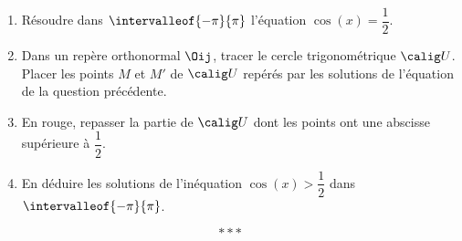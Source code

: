 \documentclass[10pt,openright,twoside,french]{book}
\begin{document}
\exo
\begin{enumerate}
    \item Résoudre dans $\intervalleof{-\pi}{\pi}$ l'équation $\cos(x) =\dfrac 12$.
    \item Dans un repère orthonormal $\Oij$, tracer le cercle trigonométrique $\calig U$. Placer les points $M$ et $M'$ de $\calig U$ repérés par les solutions de l'équation de la question précédente.
    \item En rouge, repasser la partie de $\calig U$ dont les points ont une abscisse supérieure à $\dfrac 12$.
    \item En déduire les solutions de l'inéquation $\cos(x) > \dfrac 12$ dans $\intervalleof{-\pi}{\pi}$.
\end{enumerate}
\[***\]
\end{document}
